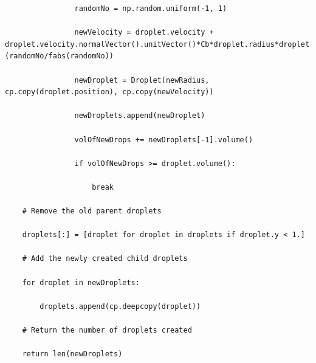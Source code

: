 \documentclass[12pt]{article}
\begin{document}
\begin{lstlisting}
                randomNo = np.random.uniform(-1, 1)                
                
                newVelocity = droplet.velocity + droplet.velocity.normalVector().unitVector()*Cb*droplet.radius*droplet.dydt*(randomNo/fabs(randomNo))                
                
                newDroplet = Droplet(newRadius, cp.copy(droplet.position), cp.copy(newVelocity))
                
                newDroplets.append(newDroplet)
                
                volOfNewDrops += newDroplets[-1].volume()
                
                if volOfNewDrops >= droplet.volume():
                    
                    break
                
    # Remove the old parent droplets
                
    droplets[:] = [droplet for droplet in droplets if droplet.y < 1.]
    
    # Add the newly created child droplets
    
    for droplet in newDroplets:
        
        droplets.append(cp.deepcopy(droplet))
        
    # Return the number of droplets created
        
    return len(newDroplets)

\end{lstlisting}
\end{document}
